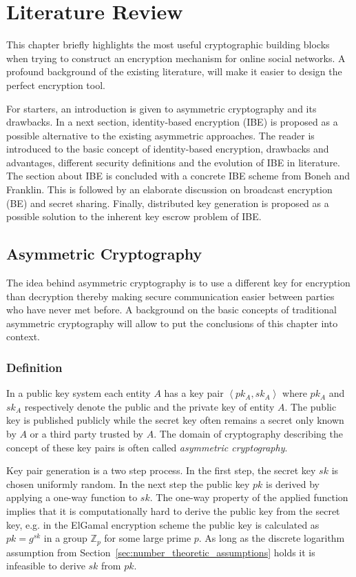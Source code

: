 \chapter{Literature Review}
\label{cha:2}
This chapter briefly highlights the most useful cryptographic building blocks when trying to construct an encryption mechanism for online social networks. A profound background of the existing literature, will make it easier to design the perfect encryption tool.

For starters, an introduction is given to asymmetric cryptography and its drawbacks. In a next section, identity-based encryption (IBE) is proposed as a possible alternative to the existing asymmetric approaches. The reader is introduced to the basic concept of identity-based encryption, drawbacks and advantages, different security definitions and the evolution of IBE in literature. The section about IBE is concluded with a concrete IBE scheme from Boneh and Franklin. This is followed by an elaborate discussion on broadcast encryption (BE) and secret sharing. Finally, distributed key generation is proposed as a possible solution to the inherent key escrow problem of IBE.

\section{Asymmetric Cryptography}
The idea behind asymmetric cryptography is to use a different key for encryption than decryption thereby making secure communication easier between parties who have never met before. A background on the basic concepts of traditional asymmetric cryptography will allow to put the conclusions of this chapter into context.

\subsection{Definition}
In a public key system each entity $A$ has a key pair $\left< pk_A, sk_A \right>$ where $pk_A$ and $sk_A$ respectively denote the public and the private key of entity $A$. The public key is published publicly while the secret key often remains a secret only known by $A$ or a third party trusted by $A$.  The domain of cryptography describing the concept of these key pairs is often called \textit{asymmetric cryptography}. 

Key pair generation is a two step process. In the first step, the secret key $sk$ is chosen uniformly random. In the next step the public key $pk$ is derived by applying a one-way function to $sk$. The one-way property of the applied function implies that it is computationally hard to derive the public key from the secret key, e.g. in the ElGamal encryption scheme the public key is calculated as $pk = g^{sk}$ in a group $\mathbb{Z}_p$ for some large prime $p$. As long as the discrete logarithm assumption from Section~\ref{sec:number_theoretic_assumptions} holds it is infeasible to derive $sk$ from $pk$.

